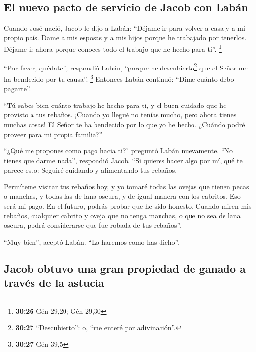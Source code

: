 \hypertarget{el-nuevo-pacto-de-servicio-de-jacob-con-labuxe1n}{%
\subsection{El nuevo pacto de servicio de Jacob con
Labán}\label{el-nuevo-pacto-de-servicio-de-jacob-con-labuxe1n}}

 Cuando José nació, Jacob le dijo a Labán: ``Déjame ir
para volver a casa y a mi propio país.  Dame a mis
esposas y a mis hijos porque he trabajado por tenerlos. Déjame ir ahora
porque conoces todo el trabajo que he hecho para ti''. \footnote{\textbf{30:26}
  Gén 29,20; Gén 29,30}

 ``Por favor, quédate'', respondió Labán, ``porque he
descubierto\footnote{\textbf{30:27} ``Descubierto'': o, ``me enteré por
  adivinación''.} que el Señor me ha bendecido por tu causa''.
\footnote{\textbf{30:27} Gén 39,5}  Entonces Labán
continuó: ``Dime cuánto debo pagarte''.

 ``Tú sabes bien cuánto trabajo he hecho para ti, y el
buen cuidado que he provisto a tus rebaños.  ¡Cuando yo
llegué no tenías mucho, pero ahora tienes muchas cosas! El Señor te ha
bendecido por lo que yo he hecho. ¿Cuándo podré proveer para mi propia
familia?''

 ``¿Qué me propones como pago hacia ti?'' preguntó Labán
nuevamente. ``No tienes que darme nada'', respondió Jacob. ``Si quieres
hacer algo por mí, qué te parece esto: Seguiré cuidando y alimentando
tus rebaños.

 Permíteme visitar tus rebaños hoy, y yo tomaré todas las
ovejas que tienen pecas o manchas, y todas las de lana oscura, y de
igual manera con los cabritos. Eso será mi pago.  En el
futuro, podrás probar que he sido honesto. Cuando miren mis rebaños,
cualquier cabrito y oveja que no tenga manchas, o que no sea de lana
oscura, podrá considerarse que fue robada de tus rebaños''.

 ``Muy bien'', aceptó Labán. ``Lo haremos como has
dicho''.

\hypertarget{jacob-obtuvo-una-gran-propiedad-de-ganado-a-travuxe9s-de-la-astucia}{%
\subsection{Jacob obtuvo una gran propiedad de ganado a través de la
astucia}\label{jacob-obtuvo-una-gran-propiedad-de-ganado-a-travuxe9s-de-la-astucia}}

